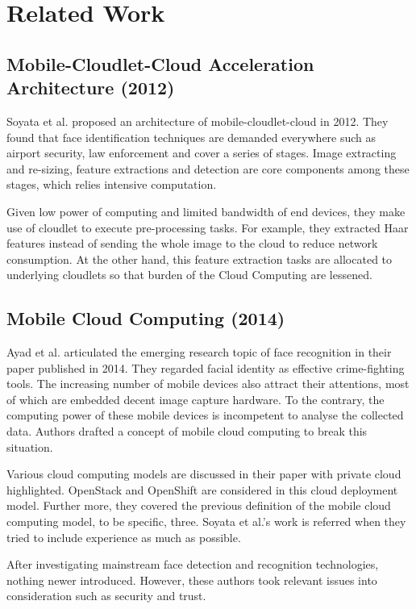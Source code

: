 \chapter{Related Work} \label{chap:relatedwork}


\section{Mobile-Cloudlet-Cloud Acceleration Architecture (2012)}

Soyata et al. proposed an architecture of mobile-cloudlet-cloud in 2012. They found that face identification techniques are demanded everywhere such as airport security, law enforcement and cover a series of stages. Image extracting and re-sizing, feature extractions and detection are core components among these stages, which relies intensive computation.

Given low power of computing and limited bandwidth of end devices, they make use of cloudlet to execute pre-processing tasks. For example, they extracted Haar features instead of sending the whole image to the cloud to reduce network consumption. At the other hand, this feature extraction tasks are allocated to underlying cloudlets so that burden of the Cloud Computing are lessened.

\section{Mobile Cloud Computing (2014)}

Ayad et al. articulated the emerging research topic of face recognition in their paper published in 2014. They regarded facial identity as effective crime-fighting tools. The increasing number of mobile devices also attract their attentions, most of which are embedded decent image capture hardware. To the contrary, the computing power of these mobile devices is incompetent to analyse the collected data. Authors drafted a concept of mobile cloud computing to break this situation. 

Various cloud computing models are discussed in their paper with private cloud highlighted. OpenStack and OpenShift are considered in this cloud deployment model. Further more, they covered the previous definition of the mobile cloud computing model, to be specific, three. Soyata et al.'s work is referred when they tried to include experience as much as possible.

After investigating mainstream face detection and recognition technologies, nothing newer introduced. However, these authors took relevant issues into consideration such as security and trust.

